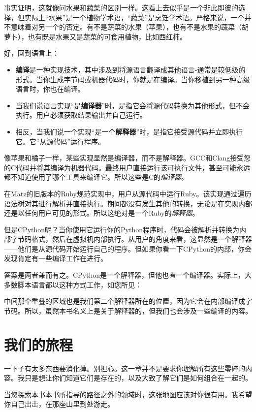 \documentclass[cn,11pt,chinese]{elegantbook}
\begin{document}
事实证明，这就像问水果和蔬菜的区别一样。这看上去似乎是一个非此即彼的选择，但实际上“水果”是一个植物学术语，“蔬菜”是烹饪学术语。严格来说，一个并不意味着对另一个的否定。有不是蔬菜的水果（苹果），也有不是水果的蔬菜（胡萝卜），也有既是水果又是蔬菜的可食用植物，比如西红柿。

好，回到语言上：

\begin{itemize}
  \item \textbf{编译}是一种实现技术，其中涉及到将源语言翻译成其他语言-通常是较低级的形式。当你生成字节码或机器代码时，你就是在编译。当你移植到另一种高级语言时，你也在编译。
  \item 当我们说语言实现“是\textbf{编译器}”时，是指它会将源代码转换为其他形式，但不会执行。用户必须获取结果输出并自己运行。
  \item 相反，当我们说一个实现“是一个\textbf{解释器}”时，是指它接受源代码并立即执行它。它“从源代码”运行程序。
\end{itemize}

像苹果和橘子一样，某些实现显然是编译器，而不是解释器。GCC和Clang接受您的C代码并将其编译为机器代码。最终用户直接运行该可执行文件，甚至可能永远都不知道使用了哪个工具来编译它。所以这些是C的\textit{编译器}。

在Matz的旧版本的Ruby规范实现中，用户从源代码中运行Ruby。该实现通过遍历语法树对其进行解析并直接执行。期间都没有发生其他的转换，无论是在实现内部还是以任何用户可见的形式。所以这绝对是一个Ruby的\textit{解释器}。

但是CPython呢？当你使用它运行你的Python程序时，代码会被解析并转换为内部字节码格式，然后在虚拟机内部执行。从用户的角度来看，这显然是一个解释器——他们是从源代码开始运行自己的程序。但如果你看一下CPython的内部，你会发现肯定有一些编译工作在进行。

答案是两者兼而有之。CPython是一个解释器，但他也\textit{有}一个编译器。实际上，大多数脚本语言都以这种方式工作，如您所见：

中间那个重叠的区域也是我们第二个解释器所在的位置，因为它会在内部编译成字节码。所以，虽然本书名义上是关于解释器的，但我们也会涉及一些编译的内容。

\section{我们的旅程}

一下子有太多东西要消化掉。别担心。这一章并不是要求你理解所有这些零碎的内容。我只是想让你们知道它们是存在的，以及大致了解它们是如何组合在一起的。

当您探索本书本书所指导的路径之外的领域时，这张地图应该对你很有用。我希望你自己出击，在那座山里到处游走。
\end{document}
